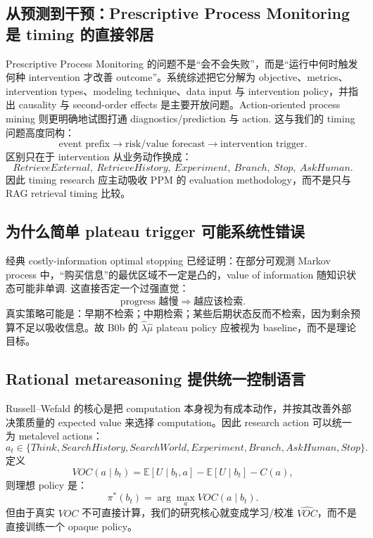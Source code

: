 \documentclass[11pt,a4paper]{ctexart}
\begin{document}
\subsection{从预测到干预：Prescriptive Process Monitoring 是 timing 的直接邻居}

Prescriptive Process Monitoring 的问题不是“会不会失败”，而是“运行中何时触发何种 intervention 才改善 outcome”。系统综述把它分解为 objective、metrics、intervention types、modeling technique、data input 与 intervention policy，并指出 causality 与 second-order effects 是主要开放问题\cite{kubrak2022prescriptive}。Action-oriented process mining 则更明确地试图打通 diagnostics/prediction 与 action\cite{gronau2022action}. 这与我们的 timing 问题高度同构：
\begin{equation}
\text{event prefix}\to \text{risk/value forecast}\to \text{intervention trigger}.
\end{equation}
区别只在于 intervention 从业务动作换成：
\[
RetrieveExternal,\ RetrieveHistory,\ Experiment,\ Branch,\ Stop,\ AskHuman.
\]
因此 timing research 应主动吸收 PPM 的 evaluation methodology，而不是只与 RAG retrieval timing 比较。

\subsection{为什么简单 plateau trigger 可能系统性错误}

经典 costly-information optimal stopping 已经证明：在部分可观测 Markov process 中，“购买信息”的最优区域不一定是凸的，value of information 随知识状态可能非单调\cite{monahan1980}. 这直接否定一个过强直觉：
\[
\text{progress 越慢}\Rightarrow\text{越应该检索}.
\]
真实策略可能是：早期不检索；中期检索；某些后期状态反而不检索，因为剩余预算不足以吸收信息。故 B0b 的 $\hat\lambda\hat\mu$ plateau policy 应被视为 baseline，而不是理论目标。

\subsection{Rational metareasoning 提供统一控制语言}

Russell--Wefald 的核心是把 computation 本身视为有成本动作，并按其改善外部决策质量的 expected value 来选择 computation\cite{russell1991meta}。因此 research action 可以统一为 metalevel actions：
\begin{equation}
 a_t\in\{Think,SearchHistory,SearchWorld,Experiment,Branch,AskHuman,Stop\}.
\end{equation}
定义
\begin{equation}
 VOC(a\mid b_t)=\mathbb E[U\mid b_t,a]-\mathbb E[U\mid b_t]-C(a),
\end{equation}
则理想 policy 是：
\begin{equation}
\pi^*(b_t)=\arg\max_a VOC(a\mid b_t).
\end{equation}
但由于真实 $VOC$ 不可直接计算，我们的研究核心就变成学习/校准 $\widehat{VOC}$，而不是直接训练一个 opaque policy。
\end{document}
